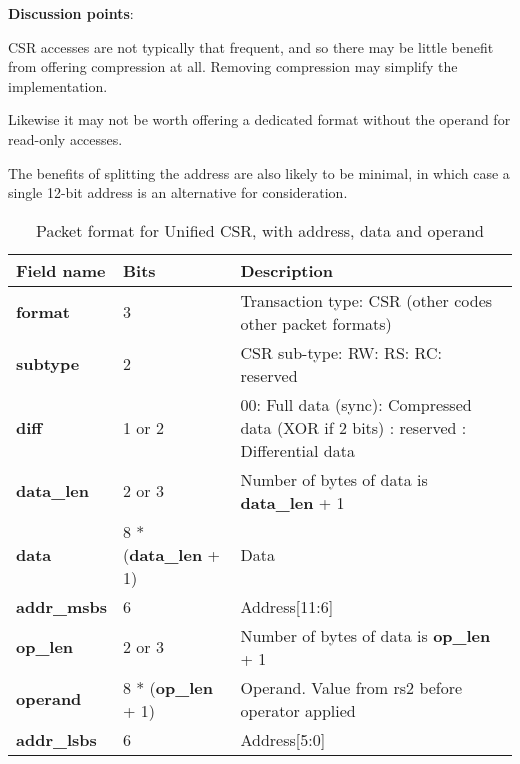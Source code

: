 \textbf{Discussion points}:

CSR accesses are not typically that frequent, and so there may be little benefit from offering compression at
all.  Removing compression may simplify the implementation.  

Likewise it may not be worth offering a dedicated format without the operand for read-only accesses.

The benefits of splitting the address are also likely to be minimal, in which case
a single 12-bit address is an alternative for consideration.

\begin{table}[htp]
  \centering
  \caption{Packet format for Unified CSR, with address, data and operand}
  \label{tab:te_datadx0y10}
  \begin{tabulary}{\textwidth}{|l|p{38mm}|p{92mm}|}
    \hline
    {\bf Field name} & {\bf Bits} & {\bf Description} \\
    \hline
    \textbf{format} & 	3	& Transaction type: CSR\newline
		(other codes other packet formats)\\
    \hline
    \textbf{subtype} & 	2	& CSR sub-type: RW: RS: RC: reserved\\	
    \hline
    \textbf{diff} & 1 or 2 & 00: Full data (sync): Compressed data (XOR if 2 bits) : reserved : Differential data\\
    \hline
    \textbf{data\_len}	& 2 or 3 & Number of bytes of data is \textbf{data\_len} + 1\\
    \hline
    \textbf{data} & 8 * (\textbf{data\_len} + 1) & Data\\
    \hline
    \textbf{addr\_msbs} & 6  &	Address[11:6]\\
    \hline
    \textbf{op\_len} & 2 or 3  & Number of bytes of data is \textbf{op\_len} + 1\\    
    \hline
    \textbf{operand}	& 8 * (\textbf{op\_len} + 1) & Operand.  Value from rs2 before operator applied\\
    \hline
    \textbf{addr\_lsbs} &  6 & Address[5:0] \\
    \hline
  \end{tabulary}
\end{table}


